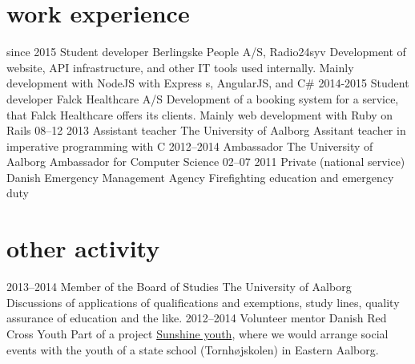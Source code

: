 \documentclass[]{friggeri-cv}
\begin{document}
\section{work experience}

\begin{entrylist}
  \entry
    {since 2015}
    {Student developer}
    {Berlingske People A/S, Radio24syv}
    {Development of website, API infrastructure, and other IT tools used internally. Mainly development with NodeJS with Express s, AngularJS, and C\#}
  \entry
    {2014-2015}
    {Student developer}
    {Falck Healthcare A/S}
    {Development of a booking system for a service, that Falck Healthcare offers its clients. Mainly web development with Ruby on Rails}
  \entry
    {08–12 2013}
    {Assistant teacher}
    {The University of Aalborg}
    {Assitant teacher in imperative programming with C}
  \entry
    {2012–2014}
    {Ambassador}
    {The University of Aalborg}
    {Ambassador for Computer Science}
  \entry
    {02–07 2011}
    {Private (national service)}
    {Danish Emergency Management Agency}
    {Firefighting education and emergency duty}
\end{entrylist}

\section{other activity}

\begin{entrylist}
  \entry
    {2013–2014}
    {Member of the Board of Studies}
    {The University of Aalborg}
    {Discussions of applications of qualifications and exemptions, study lines, quality assurance of education and the like.}
  \entry
    {2012–2014}
    {Volunteer mentor}
    {Danish Red Cross Youth}
    {Part of a project \href{http://www.urk.dk/solskinsunge/}{Sunshine youth}, where we would arrange social events with the youth of a state school (Tornhøjskolen) in Eastern Aalborg.}
\end{entrylist}
\end{document}
